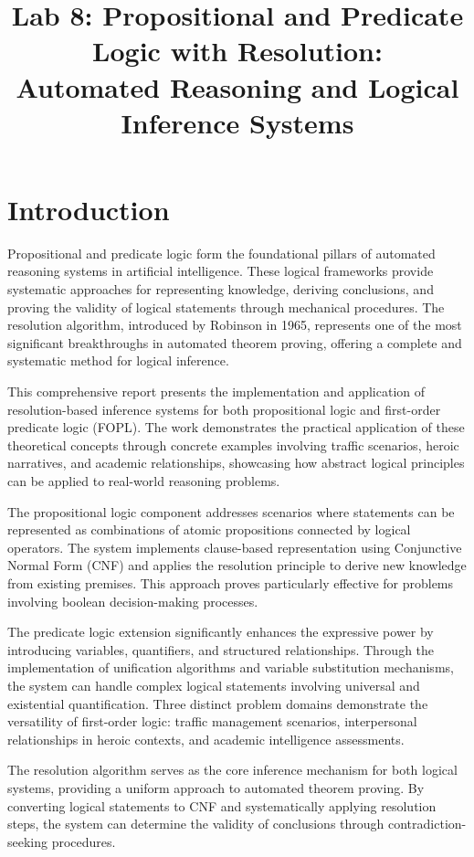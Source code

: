 \documentclass[11pt,a4paper]{article}
\title{Lab 8: Propositional and Predicate Logic with Resolution: \\ Automated Reasoning and Logical Inference Systems}
\author{}
\date{}
\begin{document}
\maketitle

\section{Introduction}

Propositional and predicate logic form the foundational pillars of automated reasoning systems in artificial intelligence. These logical frameworks provide systematic approaches for representing knowledge, deriving conclusions, and proving the validity of logical statements through mechanical procedures. The resolution algorithm, introduced by Robinson in 1965, represents one of the most significant breakthroughs in automated theorem proving, offering a complete and systematic method for logical inference.

This comprehensive report presents the implementation and application of resolution-based inference systems for both propositional logic and first-order predicate logic (FOPL). The work demonstrates the practical application of these theoretical concepts through concrete examples involving traffic scenarios, heroic narratives, and academic relationships, showcasing how abstract logical principles can be applied to real-world reasoning problems.

The propositional logic component addresses scenarios where statements can be represented as combinations of atomic propositions connected by logical operators. The system implements clause-based representation using Conjunctive Normal Form (CNF) and applies the resolution principle to derive new knowledge from existing premises. This approach proves particularly effective for problems involving boolean decision-making processes.

The predicate logic extension significantly enhances the expressive power by introducing variables, quantifiers, and structured relationships. Through the implementation of unification algorithms and variable substitution mechanisms, the system can handle complex logical statements involving universal and existential quantification. Three distinct problem domains demonstrate the versatility of first-order logic: traffic management scenarios, interpersonal relationships in heroic contexts, and academic intelligence assessments.

The resolution algorithm serves as the core inference mechanism for both logical systems, providing a uniform approach to automated theorem proving. By converting logical statements to CNF and systematically applying resolution steps, the system can determine the validity of conclusions through contradiction-seeking procedures.
\end{document}

